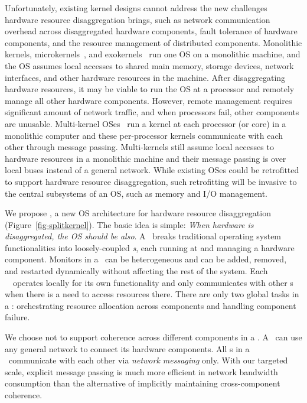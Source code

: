Unfortunately, existing kernel designs cannot address the new challenges hardware resource disaggregation brings,
such as network communication overhead across disaggregated hardware components, fault tolerance of hardware components, 
and the resource management of distributed components.
Monolithic kernels, microkernels~\cite{seL4-SOSP13}, and exokernels~\cite{Exokernel-SOSP95} run one OS on a monolithic machine,
and the OS assumes local accesses to shared main memory, storage devices, network interfaces, 
and other hardware resources in the machine.
After disaggregating hardware resources, it may be viable to run the OS at a processor and remotely manage all other hardware components.
However, remote management requires significant amount of network traffic,
and when processors fail, other components are unusable.
Multi-kernel OSes~\cite{Baumann-SOSP09,Helios-SOSP,fos-SOCC,Hive-SOSP} run a kernel
at each processor (or core) in a monolithic computer and these per-processor kernels communicate with each other through message passing.
Multi-kernels still assume local accesses to hardware resources in a monolithic machine
and their message passing is over local buses instead of a general network.
While existing OSes could be retrofitted to support hardware resource disaggregation, 
such retrofitting will be invasive to the central subsystems of an OS, such as memory and I/O management.

We propose {\em \splitkernel}, a new OS architecture for hardware resource disaggregation (Figure~\ref{fig-splitkernel}).
The basic idea is simple: \textit{When hardware is disaggregated, the OS should be also}.  
A \splitkernel\ breaks traditional operating system functionalities into loosely-coupled {\em \microos{}s},
each running at and managing a hardware component.
Monitors in a \splitkernel\ can be heterogeneous and can be added, removed, 
and restarted dynamically without affecting the rest of the system.
Each \splitkernel\ \microos\ operates locally for its own functionality and
only communicates with other \microos{}s when there is a need to access resources there.
There are only two global tasks in a \splitkernel: 
orchestrating resource allocation across components 
and handling component failure.


We choose not to support coherence across different components in a \splitkernel.
A \splitkernel\ can use any general network to connect its hardware components.
All \microos{}s in a \splitkernel\ communicate with each other via {\em network messaging} only.
With our targeted scale, explicit message passing is much more efficient in network bandwidth consumption 
than the alternative of implicitly maintaining cross-component coherence.


